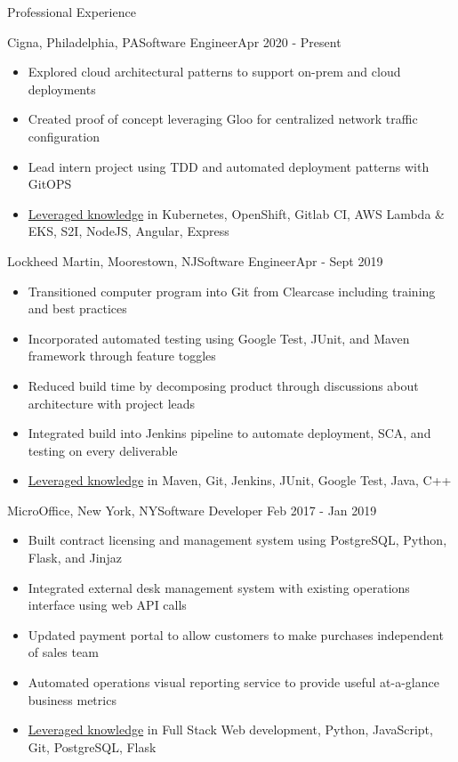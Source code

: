 \documentclass[]{mcdowellcv}
\begin{document}
	\begin{cvsection}{Professional Experience}
	    \begin{cvsubsection}{Cigna, Philadelphia, PA}{Software Engineer}{Apr 2020 - Present}
	        \begin{itemize}
	            \item Explored cloud architectural patterns to support on-prem and cloud deployments
	            \item Created proof of concept leveraging Gloo for centralized network traffic configuration
	            \item Lead intern project using TDD and automated deployment patterns with GitOPS
	            \item \underline{Leveraged knowledge} in Kubernetes, OpenShift, Gitlab CI, AWS Lambda \& EKS, S2I, NodeJS, Angular, Express
	        \end{itemize}
	    \end{cvsubsection}
		\begin{cvsubsection}{Lockheed Martin, Moorestown, NJ}{Software Engineer}{Apr - Sept 2019}
			\begin{itemize}
				\item Transitioned computer program into Git from Clearcase including training and best practices
				\item Incorporated automated testing using Google Test, JUnit, and Maven framework through feature toggles
				\item Reduced build time by decomposing product through discussions about architecture with project leads
                \item Integrated build into Jenkins pipeline to automate deployment, SCA, and testing on every deliverable
                \item \underline{Leveraged knowledge} in Maven, Git, Jenkins, JUnit, Google Test, Java, C++
			\end{itemize}
		\end{cvsubsection}
		\begin{cvsubsection}{MicroOffice, New York, NY}{Software Developer}{ Feb 2017 - Jan 2019}
			\begin{itemize}
                \item Built contract licensing and management system using PostgreSQL, Python, Flask, and Jinjaz
                \item Integrated external desk management system with existing operations interface using web API calls
                \item Updated payment portal to allow customers to make purchases independent of sales team
                \item Automated operations visual reporting service to provide useful at-a-glance business metrics
                \item \underline{Leveraged knowledge} in Full Stack Web development, Python, JavaScript, Git, PostgreSQL, Flask
			\end{itemize}
		\end{cvsubsection}
	\end{cvsection}
	
\end{document}
